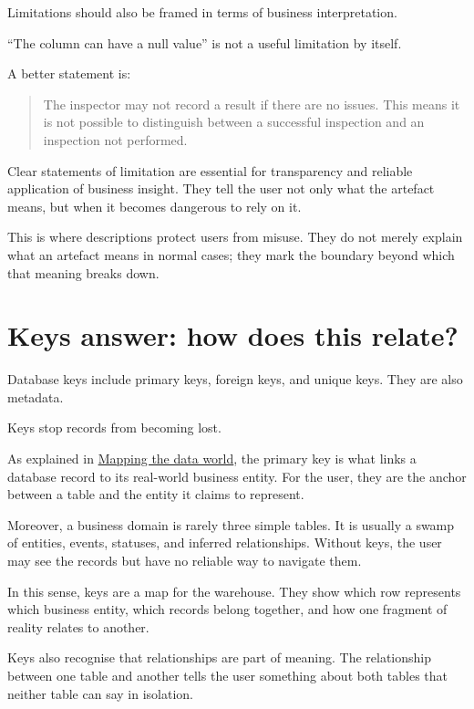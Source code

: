 \documentclass[10pt,openany,10pt]{book}
\begin{document}
Limitations should also be framed in terms of business interpretation.

``The column can have a null value'' is not a useful limitation by
itself.

A better statement is:

\begin{quote}
The inspector may not record a result if there are no issues. This means
it is not possible to distinguish between a successful inspection and an
inspection not performed.
\end{quote}

Clear statements of limitation are essential for transparency and
reliable application of business insight. They tell the user not only
what the artefact means, but when it becomes dangerous to rely on it.

This is where descriptions protect users from misuse. They do not merely
explain what an artefact means in normal cases; they mark the boundary
beyond which that meaning breaks down.

\section{Keys answer: how does this
relate?}\label{keys-answer-how-does-this-relate}

Database keys include primary keys, foreign keys, and unique keys. They
are also metadata.

Keys stop records from becoming lost.

As explained in
\hyperref[docs-creating-information-mapping-the-data-world]{Mapping the
data world}, the primary key is what links a database record to its
real-world business entity. For the user, they are the anchor between a
table and the entity it claims to represent.

Moreover, a business domain is rarely three simple tables. It is usually
a swamp of entities, events, statuses, and inferred relationships.
Without keys, the user may see the records but have no reliable way to
navigate them.

In this sense, keys are a map for the warehouse. They show which row
represents which business entity, which records belong together, and how
one fragment of reality relates to another.

Keys also recognise that relationships are part of meaning. The
relationship between one table and another tells the user something
about both tables that neither table can say in isolation.
\end{document}
